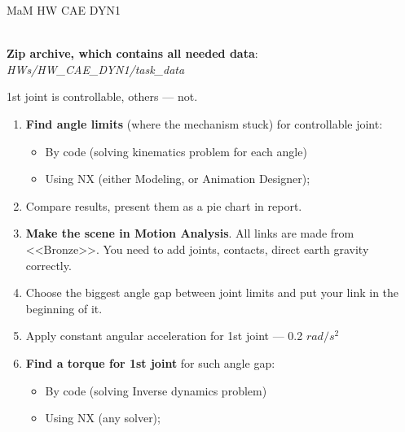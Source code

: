 \documentclass[aspectratio=169]{beamer}
\begin{document}
\begin{frame}[t]{MaM HW CAE DYN1}
    \framesubtitle{}
    \vspace{-0.6cm}
        \begin{columns}[T,onlytextwidth]
            \begin{column}{0.59\textwidth}
                \scriptsize
        \textbf{Zip archive, which contains all needed data}: \textit{HWs/HW\_CAE\_DYN1/task\_data}
        
        1st joint is controllable, others --- not.
        \vspace{-0.1cm}
        \begin{enumerate}
            \item \textbf{Find angle limits} (where the mechanism stuck) for controllable joint:
            \vspace{-0.45cm}
    
            \begin{itemize}
                \scriptsize
                \item By code (solving kinematics problem for each angle)
                \item Using NX (either Modeling, or Animation Designer);
            \end{itemize}
            \vspace{-0.2cm}
    
            \item Compare results, present them as a pie chart in report.
            \item \textbf{Make the scene in Motion Analysis}. All links are made from <<Bronze>>. You need to add joints, contacts, direct earth gravity correctly.
            \item Choose the biggest angle gap between joint limits and put your link in the beginning of it.
            \item Apply constant angular acceleration for 1st joint --- 0.2 $rad / s^2$
            \item \textbf{Find a torque for 1st joint} for such angle gap:
            \vspace{-0.1cm}
    
            \begin{itemize}
                \scriptsize
                \item By code (solving Inverse dynamics problem)
                \item Using NX (any solver);
            \end{itemize}
            \vspace{-0.2cm}
    

\end{enumerate}
\end{column}
\end{columns}
\end{frame}
\end{document}
